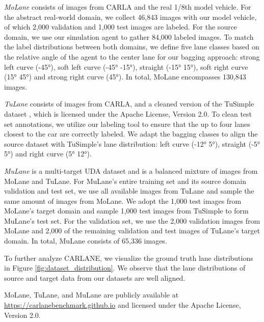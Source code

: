 \documentclass{article}
\begin{document}
	\vspace{-2pt}
	\textit{MoLane} consists of images from CARLA and the real 1/8th model vehicle. For the abstract real-world domain, we collect 46,843 images with our model vehicle, of which 2,000 validation and 1,000 test images are labeled. For the source domain, we use our simulation agent to gather 84,000 labeled images. To match the label distributions between both domains, we define five lane classes based on the relative angle  of the agent to the center lane for our bagging approach: strong left curve (\ang{-45}), soft left curve (\ang{-45}  \ang{-15}), straight (\ang{-15}  \ang{15}), soft right curve (\ang{15}  \ang{45}) and strong right curve (\ang{45}). In total, MoLane encompasses 130,843 images. 
	
	\vspace{-2pt}
	\textit{TuLane} consists of images from CARLA, and a cleaned version of the TuSimple dataset \cite{TuSimple2017}, which is licensed under the Apache License, Version 2.0. To clean test set annotations, we utilize our labeling tool to ensure that the up to four lanes closest to the car are correctly labeled. We adapt the bagging classes to align the source dataset with TuSimple's lane distribution: left curve (\ang{-12}  \ang{5}), straight (\ang{-5}  \ang{5}) and right curve (\ang{5}  \ang{12}). 
	
	\vspace{-2pt}
	\textit{MuLane} is a multi-target UDA dataset and is a balanced mixture of images from MoLane and TuLane. For MuLane's entire training set and its source domain validation and test set, we use all available images from TuLane and sample the same amount of images from MoLane. We adopt the 1,000 test images from MoLane's target domain and sample 1,000 test images from TuSimple to form MuLane's test set. For the validation set, we use the 2,000 validation images from MoLane and 2,000 of the remaining validation and test images of TuLane's target domain. In total, MuLane consists of 65,336 images.
	
	To further analyze CARLANE, we visualize the ground truth lane distributions in Figure \ref{fig:dataset_distribution}. We observe that the lane distributions of source and target data from our datasets are well aligned. 
	
	MoLane, TuLane, and MuLane are publicly available at \href{https://carlanebenchmark.github.io}{https://carlanebenchmark.github.io} and licensed under the Apache License, Version 2.0.
	
\end{document}
